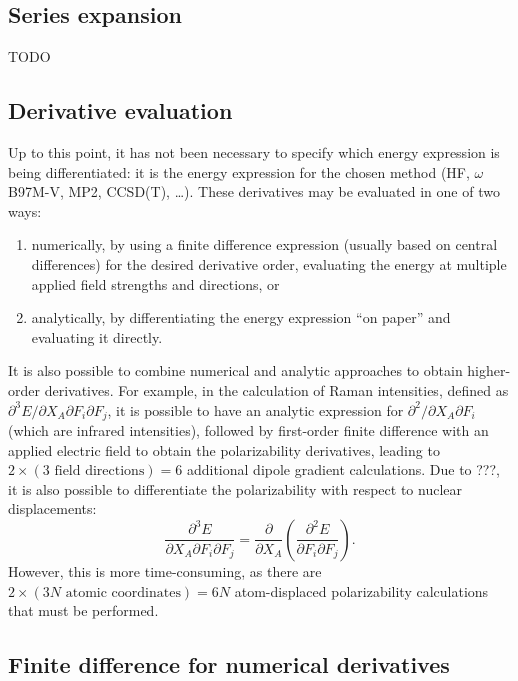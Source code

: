 \documentclass[%
class = book,%
crop = false,%
float = true,%
multi = true,%
preview = false,%
]{standalone}
\begin{document}
\subsection{Series expansion}
\label{ssec:series-expansion}

TODO

\subsection{Derivative evaluation}
\label{ssec:derivative-evaluation}

Up to this point, it has not been necessary to specify which energy expression is being differentiated: it is the energy expression for the chosen method (HF, \(\omega\)B97M-V, MP2, CCSD(T), \dots). These derivatives may be evaluated in one of two ways:
\begin{enumerate}
\item numerically, by using a finite difference expression (usually based on central differences) for the desired derivative order, evaluating the energy at multiple applied field strengths and directions, or
\item analytically, by differentiating the energy expression ``on paper'' and evaluating it directly.
\end{enumerate}
It is also possible to combine numerical and analytic approaches to obtain higher-order derivatives. For example, in the calculation of Raman intensities, defined as \(\partial^{3} E / \partial X_{A} \partial F_{i} \partial F_{j}\), it is possible to have an analytic expression for \(\partial^{2} / \partial X_{A} \partial F_{i}\) (which are infrared intensities), followed by first-order finite difference with an applied electric field to obtain the polarizability derivatives, leading to \(2 \times (3 \,\,\text{field directions}) = 6\) additional dipole gradient calculations. Due to ???, it is also possible to differentiate the polarizability with respect to nuclear displacements:
\begin{equation}
  \frac{\partial^{3} E}{\partial X_{A} \partial F_{i} \partial F_{j}} = \frac{\partial}{\partial X_{A}} \left( \frac{\partial^{2} E}{\partial F_{i} \partial F_{j}} \right).
\end{equation}
However, this is more time-consuming, as there are \(2 \times (3N \,\,\text{atomic coordinates}) = 6N\) atom-displaced polarizability calculations that must be performed.

\subsection{Finite difference for numerical derivatives}
\label{ssec:finite-difference-for-numerical-derivatives}
\end{document}
